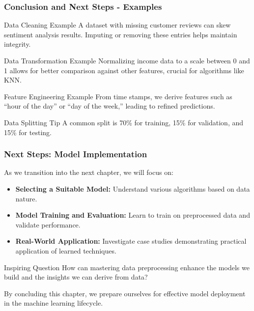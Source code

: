 \documentclass[aspectratio=169]{beamer}
\begin{document}
\begin{frame}[fragile]
  \frametitle{Conclusion and Next Steps - Examples}
  
  \begin{block}{Data Cleaning Example}
    A dataset with missing customer reviews can skew sentiment analysis results. Imputing or removing these entries helps maintain integrity.
  \end{block}
  
  \begin{block}{Data Transformation Example}
    Normalizing income data to a scale between 0 and 1 allows for better comparison against other features, crucial for algorithms like KNN.
  \end{block}

  \begin{block}{Feature Engineering Example}
    From time stamps, we derive features such as “hour of the day” or “day of the week,” leading to refined predictions.
  \end{block}

  \begin{block}{Data Splitting Tip}
    A common split is 70\% for training, 15\% for validation, and 15\% for testing.
  \end{block}
  
\end{frame}

\begin{frame}[fragile]
  \frametitle{Next Steps: Model Implementation}

  As we transition into the next chapter, we will focus on:
  
  \begin{itemize}
    \item \textbf{Selecting a Suitable Model:} Understand various algorithms based on data nature.
    \item \textbf{Model Training and Evaluation:} Learn to train on preprocessed data and validate performance.
    \item \textbf{Real-World Application:} Investigate case studies demonstrating practical application of learned techniques.
  \end{itemize}

  \begin{block}{Inspiring Question}
    How can mastering data preprocessing enhance the models we build and the insights we can derive from data?
  \end{block}

  By concluding this chapter, we prepare ourselves for effective model deployment in the machine learning lifecycle.
  
\end{frame}
\end{document}
